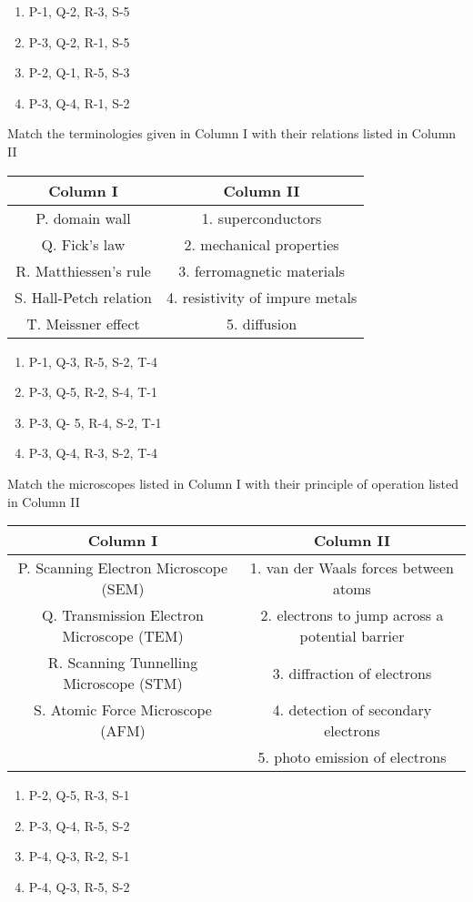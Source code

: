 \begin{enumerate}
    \item P-1, Q-2, R-3, S-5
    \item P-3, Q-2, R-1, S-5
    \item P-2, Q-1, R-5, S-3
    \item P-3, Q-4, R-1, S-2
\end{enumerate}
\bigskip 
\item Match the terminologies given in Column I with their relations listed in Column II
\begin{tabular}{|c|c|}
\hline
\textbf{Column I} & \textbf{Column II} \\
\hline
P. domain wall & 1. superconductors \\
Q. Fick's law & 2. mechanical properties \\
R. Matthiessen's rule & 3. ferromagnetic materials \\
S. Hall-Petch relation & 4. resistivity of impure metals \\
T. Meissner effect & 5. diffusion \\
\hline
\end{tabular}
\begin{enumerate}
    \item P-1, Q-3, R-5, S-2, T-4 
    \item P-3, Q-5, R-2, S-4, T-1
    \item P-3, Q- 5, R-4, S-2, T-1
    \item P-3, Q-4, R-3, S-2, T-4
\end{enumerate}
\bigskip
\item Match the microscopes listed in Column I with their principle of operation listed in Column II
\begin{tabular}{|c|c|}
\hline
\textbf{Column I} & \textbf{Column II} \\
\hline
P. Scanning Electron Microscope (SEM) & 1. van der Waals forces between atoms \\
Q. Transmission Electron Microscope (TEM) & 2. electrons to jump across a potential barrier \\
R. Scanning Tunnelling Microscope (STM) & 3. diffraction of electrons \\
S. Atomic Force Microscope (AFM) & 4. detection of secondary electrons \\
 & 5. photo emission of electrons \\
\hline
\end{tabular}
\begin{enumerate}
    \item P-2, Q-5, R-3, S-1
    \item P-3, Q-4, R-5, S-2
    \item P-4, Q-3, R-2, S-1 
    \item P-4, Q-3, R-5, S-2
\end{enumerate}
